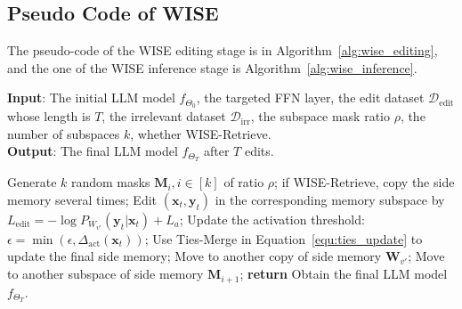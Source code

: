 \subsection{Pseudo Code of WISE}
The pseudo-code of the WISE editing stage is in Algorithm~\ref{alg:wise_editing}, and the one of the WISE inference stage is Algorithm~\ref{alg:wise_inference}.

\begin{algorithm}[h]
\vspace{-3pt}
\caption{WISE Editing Stage}
\label{alg:wise_editing}
\vspace{0.1CM}
\textbf{Input}: The initial LLM model $f_{\Theta_0}$, the targeted FFN layer, the edit dataset $\mathcal{D}_{\text{edit}}$ whose length is $T$, the irrelevant dataset $\mathcal{D}_{\text{irr}}$, the subspace mask ratio $\rho$, the number of subspaces $k$, whether WISE-Retrieve.\\
\textbf{Output}: The final LLM model $f_{\Theta_T}$ after $T$ edits.
\begin{algorithmic}[1] %
\STATE Generate $k$ random masks $\mathbf{M}_i, i \in [k]$ of ratio $\rho$; if WISE-Retrieve, copy the side memory several times;
        \STATE Edit $(\mathbf{x}_t, \mathbf{y}_t)$ in the corresponding memory subspace by $L_{\text{edit}} = -\log P_{W_{v'}}(\mathbf{y}_t | \mathbf{x}_t) + L_a$;
        \STATE Update the activation threshold: $\epsilon = \min(\epsilon, \Delta_{\text{act}}(\mathbf{x}_t))$;
            \STATE Use Ties-Merge in Equation~\ref{equ:ties_update} to update the final side memory;
                \STATE Move to another copy of side memory $\mathbf{W}_{v'}$;
            \ENDIF
        \ELSE
                \STATE Move to another subspace of side memory $\mathbf{M}_{i+1}$;
            \ENDIF
        \ENDIF
    \ENDFOR
\STATE \textbf{return} Obtain the final LLM model $f_{\Theta_T}$.
\end{algorithmic}
\end{algorithm}
\vspace{-9pt}


